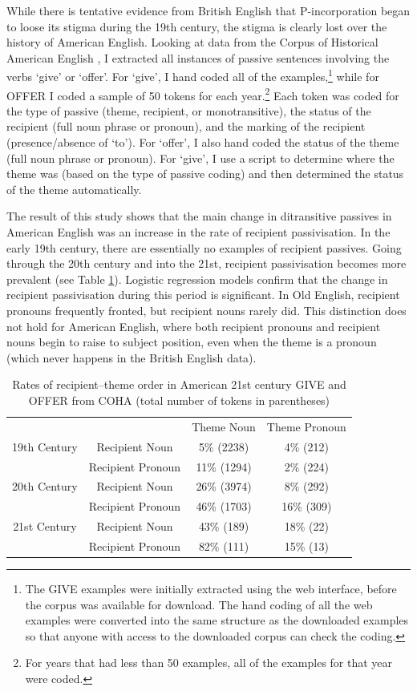 	While there is tentative evidence from British English that P-incorporation began to loose its stigma during the 19th century, the stigma is clearly lost over the history of American English. Looking at data from the Corpus of Historical American English \citep{Davies.2010}, I extracted all instances of passive sentences involving the verbs `give' or `offer'. For `give', I hand coded all of the examples,\footnote{The GIVE examples were initially extracted using the web interface, before the corpus was available for download. The hand coding of all the web examples were converted into the same structure as the downloaded examples so that anyone with access to the downloaded corpus can check the coding.} while for OFFER I coded a sample of 50 tokens for each year.\footnote{For years that had less than 50 examples, all of the examples for that year were coded.} Each token was coded for the type of passive (theme, recipient, or monotransitive), the status of the recipient (full noun phrase or pronoun), and the marking of the recipient (presence/absence of `to'). For `offer', I also hand coded the status of the theme (full noun phrase or pronoun). For `give', I use a script to determine where the theme was (based on the type of passive coding) and then determined the status of the theme automatically.

	
	The result of this study shows that the main change in ditransitive passives in American English was an increase in the rate of recipient passivisation. In the early 19th century, there are essentially no examples of recipient passives. Going through the 20th century and into the 21st, recipient passivisation becomes more prevalent (see Table \ref{tab:am-rec-rates}). Logistic regression models confirm that the change in recipient passivisation during this period is significant. In Old English, recipient pronouns frequently fronted, but recipient nouns rarely did. This distinction does not hold for American English, where both recipient pronouns and recipient nouns begin to raise to subject position, even when the theme is a pronoun (which never happens in the British English data).

	\begin{table}
		\begin{tabular}{cccc}
	&			&	Theme Noun	&	Theme Pronoun\\
19th Century& Recipient Noun	&	5\% (2238)	&	4\% (212)\\
	& Recipient Pronoun	&	11\% (1294)	&	2\% (224)\\
20th Century& Recipient Noun	&	26\% (3974)	&	8\% (292)\\
	& Recipient Pronoun	&	46\% (1703)	&	16\% (309)\\
21st Century& Recipient Noun	&	43\% (189)	&	18\% (22)\\
	& Recipient Pronoun	&	82\% (111)	&	15\% (13)\\
		\end{tabular}
		\caption{Rates of recipient--theme order in American 21st century GIVE and OFFER from COHA (total number of tokens in parentheses)}
		\label{tab:am-rec-rates}
	\end{table}

